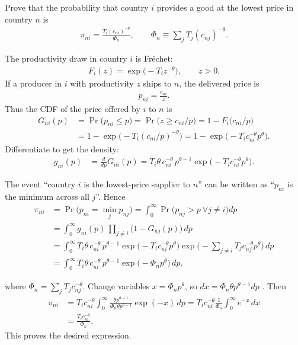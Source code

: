 Prove that the probability that country $i$ provides a good at the lowest price in country $n$ is
\begin{align*}
\pi_{ni} = \frac{T_i (c_{ni})^{-\theta}}{\Phi_n},
\qquad
\Phi_n \equiv \sum_j T_j (c_{nj})^{-\theta}.
\end{align*}

\begin{solution}
The productivity draw in country $i$ is Fr\'echet:
\begin{align*}
F_i(z) = \exp\big(-T_i z^{-\theta}\big), \qquad z>0.
\end{align*}
If a producer in $i$ with productivity $z$ ships to $n$, the delivered price is
\begin{align*}
p_{ni}=\frac{c_{ni}}{z}.
\end{align*}
Thus the CDF of the price offered by $i$ to $n$ is
\begin{align*}
G_{ni}(p)
&= \Pr\big(p_{ni}\le p\big)
= \Pr\big(z \ge c_{ni}/p\big)
= 1 - F_i\!\big(c_{ni}/p\big) \\
&= 1 - \exp\!\big(-T_i (c_{ni}/p)^{-\theta}\big)
= 1 - \exp\!\big(-T_i c_{ni}^{-\theta} p^{\theta}\big).
\end{align*}
Differentiate to get the density:
\begin{align*}
g_{ni}(p)
&= \frac{d}{dp}G_{ni}(p)
= T_i \theta\, c_{ni}^{-\theta}\, p^{\theta-1}
    \exp\!\big(-T_i c_{ni}^{-\theta} p^{\theta}\big).
\end{align*}

The event ``country $i$ is the lowest-price supplier to $n$'' can be written as
``$p_{ni}$ is the minimum across all $j$''. Hence
\begin{align*}
\pi_{ni}
&= \Pr\big(p_{ni} = \min_j p_{nj}\big)
= \int_0^\infty \Pr\big(p_{nj}>p\ \forall j\neq i\big) dp \\
&= \int_0^\infty g_{ni}(p)\, \prod_{j\neq i}\big(1-G_{nj}(p)\big)\, dp \\
&= \int_0^\infty T_i \theta\, c_{ni}^{-\theta}\, p^{\theta-1}
    \exp\!\big(-T_i c_{ni}^{-\theta} p^{\theta}\big)
    \exp\!\Big(-\sum_{j\neq i} T_j c_{nj}^{-\theta} p^{\theta}\Big)\, dp \\
&= \int_0^\infty T_i \theta\, c_{ni}^{-\theta}\, p^{\theta-1}
    \exp\!\big(-\Phi_n p^{\theta}\big)\, dp.
\end{align*}

where $\Phi_n = \sum_j T_j c_{nj}^{-\theta}$. Change variables $x=\Phi_n p^{\theta}$, so $dx = \Phi_n \theta p^{\theta-1} dp$ . Then
\begin{align*}
\pi_{ni}
&= T_i c_{ni}^{-\theta} \int_0^\infty \frac{\theta p^{\theta-1}}{\Phi_n \theta p^{\theta-1}}
    \exp(-x)\, dp
= T_i c_{ni}^{-\theta} \frac{1}{\Phi_n}\int_0^\infty e^{-x}\, dx \\
&= \frac{T_i c_{ni}^{-\theta}}{\Phi_n}.
\end{align*}
This proves the desired expression.
\end{solution}
